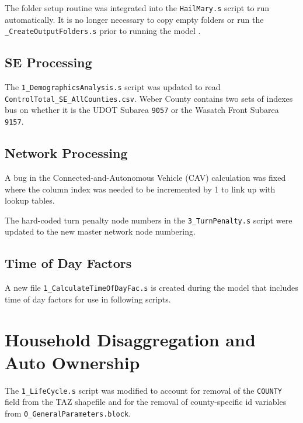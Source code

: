 \documentclass[
  letterpaper,
  DIV=11,
  numbers=noendperiod,
  titlepage=false]{scrreprt}
\begin{document}
The folder setup routine was integrated into the \texttt{HailMary.s}
script to run automatically. It is no longer necessary to copy empty
folders or run the \texttt{\_CreateOutputFolders.s} prior to running the
model .

\hypertarget{se-processing}{%
\section{SE Processing}\label{se-processing}}

The \texttt{1\_DemographicsAnalysis.s} script was updated to read \\
\texttt{ControlTotal\_SE\_AllCounties.csv}. Weber County contains two
sets of indexes bus on whether it is the UDOT Subarea \texttt{9057} or
the Wasatch Front Subarea \texttt{9157}.

\hypertarget{network-processing}{%
\section{Network Processing}\label{network-processing}}

A bug in the Connected-and-Autonomous Vehicle (CAV) calculation was
fixed where the column index was needed to be incremented by 1 to link
up with lookup tables.

The hard-coded turn penalty node numbers in the
\texttt{3\_TurnPenalty.s} script were updated to the new master network
node numbering.

\hypertarget{time-of-day-factors}{%
\section{Time of Day Factors}\label{time-of-day-factors}}

A new file \texttt{1\_CalculateTimeOfDayFac.s} is created during the
model that includes time of day factors for use in following scripts.


\hypertarget{household-disaggregation-and-auto-ownership-1}{%
\chapter{Household Disaggregation and Auto
Ownership}\label{household-disaggregation-and-auto-ownership-1}}

The \texttt{1\_LifeCycle.s} script was modified to account for removal
of the \texttt{COUNTY} field from the TAZ shapefile and for the removal
of county-specific id variables from
\texttt{0\_GeneralParameters.block}.
\end{document}

